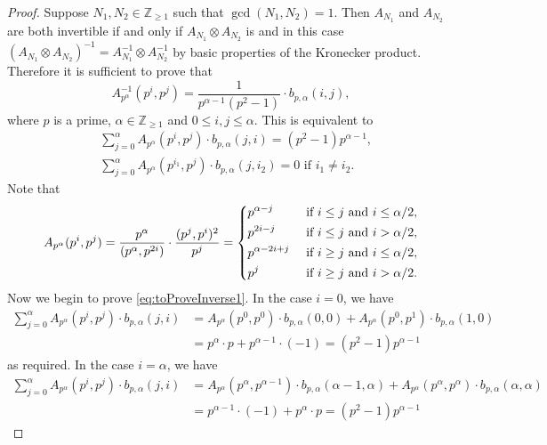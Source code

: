 \documentclass[12pt]{amsart}
\numberwithin{equation}{section}
\theoremstyle{plain}
\theoremstyle{definition}
\theoremstyle{remark}
\newcommand\numgeq[2]{\mathbb{#1}_{\geq #2}}
\begin{document}
\begin{proof}
Suppose $N_1,N_2\in\numgeq{Z}{1}$ such that $\gcd(N_1,N_2)=1$. Then $A_{N_1}$ and $A_{N_2}$ are both invertible if and only if $A_{N_1}\otimes A_{N_2}$ is and in this case $(A_{N_1}\otimes A_{N_2})^{-1}=A_{N_1}^{-1}\otimes A_{N_2}^{-1}$ by basic properties of the Kronecker product. Therefore it is sufficient to prove that
\begin{equation*}
A_{p^\alpha}^{-1}(p^i,p^j)=\frac{1}{p^{\alpha-1}(p^2-1)}\cdot b_{p,\alpha}(i,j),
\end{equation*}
where $p$ is a prime, $\alpha\in\numgeq{Z}{1}$ and $0\leq i,j\leq\alpha$. This is equivalent to
\begin{align}
&\sum_{j=0}^{\alpha}A_{p^\alpha}(p^i,p^j)\cdot b_{p,\alpha}(j,i)=(p^2-1)p^{\alpha-1}, \label{eq:toProveInverse1}\\
&\sum_{j=0}^{\alpha}A_{p^\alpha}(p^{i_1},p^j)\cdot b_{p,\alpha}(j,i_2)=0 \text{  if } i_1\neq i_2. \label{eq:toProveInverse2}
\end{align}
Note that
\begin{equation*}
A_{p^\alpha}(p^i,p^j)=\frac{p^\alpha}{(p^\alpha,p^{2i})}\cdot\frac{(p^j,p^i)^2}{p^j}=\begin{dcases}
p^{\alpha-j} &\text{  if }i\leq j \text{ and } i\leq\alpha/2,\\
p^{2i-j} &\text{  if }i\leq j \text{ and } i>\alpha/2,\\
p^{\alpha-2i+j} &\text{  if }i\geq j \text{ and } i\leq\alpha/2,\\
p^{j} &\text{  if }i\geq j \text{ and } i>\alpha/2.
\end{dcases}
\end{equation*}
Now we begin to prove \eqref{eq:toProveInverse1}. In the case $i=0$, we have
\begin{align*}
\sum_{j=0}^{\alpha}A_{p^\alpha}(p^i,p^j)\cdot b_{p,\alpha}(j,i)&=A_{p^\alpha}(p^0,p^0)\cdot b_{p,\alpha}(0,0)+A_{p^\alpha}(p^0,p^1)\cdot b_{p,\alpha}(1,0)\\
&=p^\alpha\cdot p + p^{\alpha-1}\cdot(-1)=(p^2-1)p^{\alpha-1}
\end{align*}
as required. In the case $i=\alpha$, we have
\begin{align*}
\sum_{j=0}^{\alpha}A_{p^\alpha}(p^i,p^j)\cdot b_{p,\alpha}(j,i)&=A_{p^\alpha}(p^\alpha,p^{\alpha-1})\cdot b_{p,\alpha}(\alpha-1,\alpha)+A_{p^\alpha}(p^\alpha,p^\alpha)\cdot b_{p,\alpha}(\alpha,\alpha)\\
&=p^{\alpha-1}\cdot(-1) + p^{\alpha}\cdot p=(p^2-1)p^{\alpha-1}
\end{align*}

\end{proof}
\end{document}
